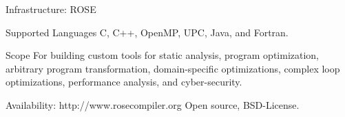 \begin{frame}{Infrastructure: ROSE}

\begin{block}{Supported Languages}
C, C++, OpenMP, UPC, Java, and Fortran. 
\end{block}

\begin{block}{Scope}
For building custom tools for static analysis, program optimization, arbitrary program transformation, domain-specific optimizations, complex loop optimizations, performance analysis, and cyber-security.
\end{block}

\begin{block}{Availability: http://www.rosecompiler.org}
Open source, BSD-License.
\end{block}
\end{frame}



